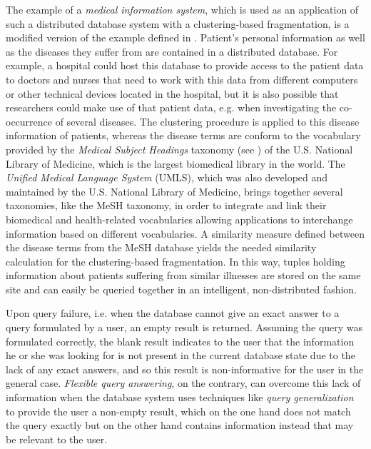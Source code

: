 The example of a \emph{medical information system}, which is used as an application of such a distributed database system with a clustering-based 
fragmentation, is a modified version of the example defined in \citet{Wiese2014}. Patient's personal information as well as the diseases they suffer from
are contained in a distributed database. For example, a hospital could host this database to provide access to the patient data to doctors and nurses that
need to work with this data from different computers or other technical devices located in the hospital, but it is also possible that researchers could
make use of that patient data, e.g. when investigating the co-occurrence of several diseases.
The clustering procedure is applied to this disease information of patients, whereas the disease terms are conform to the vocabulary provided by the 
\emph{Medical Subject Headings} taxonomy (see ) of the U.S. National Library of Medicine, which is the largest biomedical library in 
the world. The \emph{Unified Medical Language System} (UMLS), which was also developed and maintained by the U.S. National Library of Medicine, brings
together several taxonomies, like the MeSH taxonomy, in order to integrate and link their biomedical and health-related vocabularies allowing applications
to interchange information based on different vocabularies.
A similarity measure defined between the disease terms from the MeSH database yields the needed similarity calculation for the clustering-based 
fragmentation. In this way, tuples holding information about patients suffering from similar illnesses are stored on the same site and can easily be
queried together in an intelligent, non-distributed fashion.


Upon query failure, i.e. when the database cannot give an exact answer to a query formulated by a user, an empty result is returned. Assuming the query 
was formulated correctly, the blank result indicates to the user that the information he or she was looking for is not present in the current database
state due to the lack of any exact answers, and so this result is non-informative for the user in the general case. \emph{Flexible query answering}, on 
the contrary, can overcome this lack of information when the database system uses techniques like \emph{query generalization} to provide the user a 
non-empty result, which on the one hand does not match the query exactly but on the other hand contains information instead that may be relevant to the
user.


